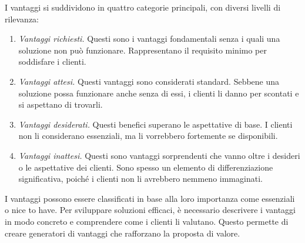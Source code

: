 I vantaggi si suddividono in quattro categorie principali, con diversi livelli di rilevanza:
\begin{enumerate}
    \item \textit{Vantaggi richiesti.}
    Questi sono i vantaggi fondamentali senza i quali una soluzione non può funzionare. Rappresentano il requisito minimo per soddisfare i clienti.
    \item \textit{Vantaggi attesi.} Questi vantaggi sono considerati standard. Sebbene una soluzione possa funzionare anche senza di essi, i clienti li danno per scontati e si aspettano di trovarli.
    \item \textit{Vantaggi desiderati.} Questi benefici superano le aspettative di base. I clienti non li considerano essenziali, ma li vorrebbero fortemente se disponibili.
    \item \textit{Vantaggi inattesi.} Questi sono vantaggi sorprendenti che vanno oltre i desideri o le aspettative dei clienti. Sono spesso un elemento di differenziazione significativa, poiché i clienti non li avrebbero nemmeno immaginati.
\end{enumerate}
I vantaggi possono essere classificati in base alla loro importanza come essenziali o nice to have. Per sviluppare soluzioni efficaci, è necessario descrivere i vantaggi in modo concreto e comprendere come i clienti li valutano. Questo permette di creare generatori di vantaggi che rafforzano la proposta di valore.

